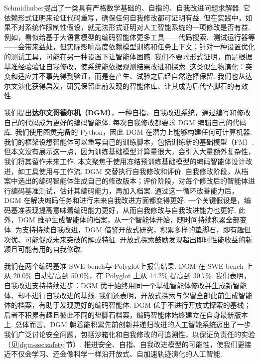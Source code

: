 Schmidhuber\cite{dgm-schmidhuber2007godel}提出了一类具有严格数学基础的、自指的、自我改进问题求解器. 它依赖形式证明来论证代码重写，确保任何自我修改都可证明有益. 但在实践中，如果不对系统作限制性假设，就无法形式证明对人工智能系统的一项修改是否有益. 例如，看似给基于大语言模型的编码智能体更多工具——代码搜索、测试运行器等——会带来益处，但实际影响高度依赖模型训练和任务上下文；针对一种设置优化的测试工具，可能在另一种设置下让智能体困惑. 我们不要求形式证明，而是根据基准经验验证自我修改，使系统能依据观测结果改进和探索. 这类似生物演化：突变和适应并不事先得到验证，而是在产生、试验之后经自然选择保留. 我们也从达尔文演化\cite{dgm-darwin2023origin}获得启发，研究保留此前发现的智能体库、让其成为后代垫脚石的有效性.

我们提出\textbf{达尔文哥德尔机（DGM）}，一种自指、自我改进系统，通过编写和修改自己的代码成为更好的编码智能体. 每次自我修改都要求 DGM 编辑自己的代码库. 我们使用图灵完备的 Python，因此 DGM 在潜力上能够构建任何可计算机器. 我们的框架设想智能体可以重写自己的训练脚本，包括训练新的基础模型（FM）. 但本文没有展示这一点，因为训练基础模型计算量很大，会引入大量额外复杂性，我们将其留作未来工作. 本文聚焦于使用冻结预训练基础模型的编码智能体设计改进，如工具使用与工作流. DGM 交替执行自我修改和评价. 自我修改阶段，从档案中选出的编码智能体生成自己的修改版本；评价阶段，对每个修改后的智能体进行编码基准测试，估计其编码能力，再加入档案. 通过这一循环改善能力后，DGM 在解决编码任务和进行未来自我改进方面都变得更好. 一个关键假设是，编码基准表现提高意味着编码能力更好，从而自我修改与自我改进能力也更好. 此外，DGM 维护生成智能体的档案，从一个智能体开始，随时间持续积累全部变体. 为支持持续自我改进，DGM 借鉴开放式研究\cite{dgm-wang2019paired,dgm-fernandopromptbreeder,dgm-faldor2025omni}，积累多样的垫脚石，即有趣但次优、可能促成未来突破的解或特征. 开放式探索鼓励发现超出即时性能收益的新颖且可能有用的自我修改.

我们在两个编码基准 SWE-bench\cite{dgm-jimenez2024swebench}与 Polyglot\cite{dgm-gauthier2024polyglot}上报告结果. DGM 在 SWE-bench 上从 20.0\% 自动提高到 50.0\%，在 Polyglot 上从 14.2\% 提高到 30.7\%. 我们表明，自我改进支持持续进步：DGM 优于始终用同一个基础智能体修改并生成新智能体、却不进行自我改进的基线. 我们还表明，开放式探索与保留全部此前生成智能体的档案，有助于发现更好的编码智能体. DGM 优于不进行开放式探索的基线；后者不积累有趣且彼此不同的垫脚石档案，编码智能体始终建立在自身最新版本上. 总体而言，DGM 朝着能积累先前创新并递归改进的人工智能系统迈出了一步. 我们广泛讨论安全问题，包括沙箱化和自我修改的可追溯性，以保证负责任的实验（见\ref{dgm-sec:safety}节）. 推进安全、自指、自我改进模型的可能性，使我们更接近不仅会学习、还会像科学一样沿开放式、自加速轨迹演化的人工智能.

